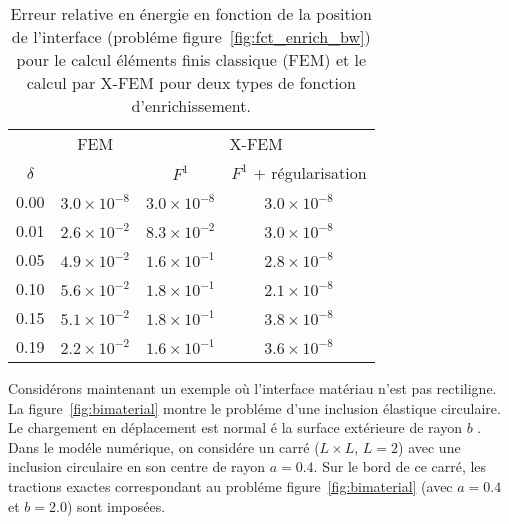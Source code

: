\begin{table}[htb]
\begin{center}

\begin{tabular}{c|c|cc} \hline
      & FEM &\multicolumn{2}{c}{X-FEM} \\
$\delta$ & & $F^1$ & $F^1$ + r\'egularisation \\ \hline
0.00 & $3.0 \times 10^{-8}$  & $3.0 \times 10^{-8}$   &  $3.0 \times 10^{-8}$ \\ \hline
0.01 & $2.6 \times 10^{-2}$ &  $8.3 \times 10^{-2}$ & $3.0 \times 10^{-8}$  \\
0.05 & $4.9 \times 10^{-2}$ &  $1.6 \times 10^{-1}$ & $2.8 \times 10^{-8}$  \\
0.10 & $5.6 \times 10^{-2}$ &  $1.8 \times 10^{-1}$ & $2.1 \times 10^{-8}$  \\
0.15 & $5.1 \times 10^{-2}$   &  $1.8 \times 10^{-1}$ & $3.8 \times 10^{-8}$  \\
0.19 & $2.2 \times 10^{-2}$   &  $1.6 \times 10^{-1}$ & $3.6 \times 10^{-8}$  \\ \hline
\end{tabular}
\vspace*{0.1in}
\caption{Erreur relative en \'energie en fonction de la position
de l'interface (probl\'eme figure~\ref{fig:fct_enrich_bw})
pour le calcul \'el\'ements finis classique (FEM) et le calcul par
X-FEM pour deux types de fonction d'enrichissement.}
\label{tab:1D}
\end{center}
\end{table}


Consid\'erons maintenant un exemple o\`u l'interface mat\'eriau n'est pas
rectiligne. La figure~\ref{fig:bimaterial} montre le probl\'eme d'une
inclusion \'elastique circulaire. Le chargement en d\'eplacement est
normal \'e la surface ext\'erieure de rayon $b$
\cite{Sukumar:inclusion}. Dans le mod\'ele num\'erique, on consid\'ere un
carr\'e ($L \times L$, $L = 2$) avec une inclusion circulaire en son
centre de rayon $a=0.4$. Sur le bord de ce carr\'e, les tractions
exactes correspondant au probl\'eme figure~\ref{fig:bimaterial} (avec
$a = 0.4$ et $b = 2.0$) sont impos\'ees.





